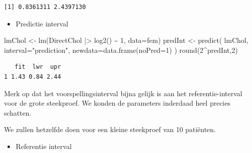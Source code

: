 \documentclass[
  dutch,
  letterpaper,
  12pt]{book}
\newenvironment{Shaded}{\begin{snugshade}}{\end{snugshade}}
\newcommand{\AttributeTok}[1]{\textcolor[rgb]{0.40,0.45,0.13}{#1}}
\newcommand{\DecValTok}[1]{\textcolor[rgb]{0.68,0.00,0.00}{#1}}
\newcommand{\FunctionTok}[1]{\textcolor[rgb]{0.28,0.35,0.67}{#1}}
\newcommand{\NormalTok}[1]{\textcolor[rgb]{0.00,0.23,0.31}{#1}}
\newcommand{\OtherTok}[1]{\textcolor[rgb]{0.00,0.23,0.31}{#1}}
\newcommand{\SpecialCharTok}[1]{\textcolor[rgb]{0.37,0.37,0.37}{#1}}
\newcommand{\StringTok}[1]{\textcolor[rgb]{0.13,0.47,0.30}{#1}}
\providecommand{\tightlist}{%
  \setlength{\itemsep}{0pt}\setlength{\parskip}{0pt}}
\theoremstyle{definition}
\theoremstyle{definition}
\theoremstyle{definition}
\theoremstyle{remark}
\begin{document}
\begin{verbatim}
[1] 0.8361311 2.4397130
\end{verbatim}

\begin{itemize}
\tightlist
\item
  Predictie interval
\end{itemize}

\begin{Shaded}
\begin{Highlighting}[]
\NormalTok{lmChol }\OtherTok{\textless{}{-}} \FunctionTok{lm}\NormalTok{(DirectChol }\SpecialCharTok{|\textgreater{}} \FunctionTok{log2}\NormalTok{() }\SpecialCharTok{\textasciitilde{}} \DecValTok{1}\NormalTok{, }\AttributeTok{data=}\NormalTok{fem)}
\NormalTok{predInt }\OtherTok{\textless{}{-}} \FunctionTok{predict}\NormalTok{(}
\NormalTok{  lmChol,}
  \AttributeTok{interval=}\StringTok{"prediction"}\NormalTok{,}
  \AttributeTok{newdata=}\FunctionTok{data.frame}\NormalTok{(}\AttributeTok{noPred=}\DecValTok{1}\NormalTok{)}
\NormalTok{  )}
\FunctionTok{round}\NormalTok{(}\DecValTok{2}\SpecialCharTok{\^{}}\NormalTok{predInt,}\DecValTok{2}\NormalTok{)}
\end{Highlighting}
\end{Shaded}

\begin{verbatim}
   fit  lwr  upr
1 1.43 0.84 2.44
\end{verbatim}

Merk op dat het voorspellingsinterval bijna gelijk is aan het
referentie-interval voor de grote steekproef. We konden de parameters
inderdaad heel precies schatten.

We zullen hetzelfde doen voor een kleine steekproef van 10 patiënten.

\begin{itemize}
\tightlist
\item
  Referentie interval
\end{itemize}
\end{document}

